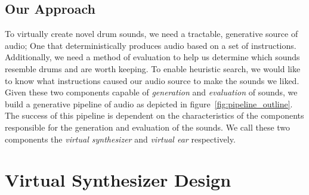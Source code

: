 \documentclass[runningheads,a4paper]{llncs}
\begin{document}
\subsection{Our Approach}
To virtually create novel drum sounds, we need a tractable, generative source of audio; One that deterministically produces audio based on a set of instructions. Additionally, we need a method of evaluation to help us determine which sounds resemble drums and are worth keeping. To enable heuristic search, we would like to know what instructions caused our audio source to make the sounds we liked. Given these two components capable of \textit{generation} and \textit{evaluation} of sounds, we build a generative pipeline of audio as depicted in figure~\ref{fig:pipeline_outline}. The success of this pipeline is dependent on the characteristics of the components responsible for the generation and evaluation of the sounds. We call these two components the \emph{virtual synthesizer} and \emph{virtual ear} respectively.  

\section{Virtual Synthesizer Design}
\begin{table}[htbp]
\centering
{}
\caption{Synthesizer submodule Parameters. Despite the simplicity of the parameters and our efforts at constraining the ranges, the number of parameters that can be randomly chosen for each submodule is in the order of $10^{15}$ }
\label{table:submodule_params}
\end{table}
\end{document}
